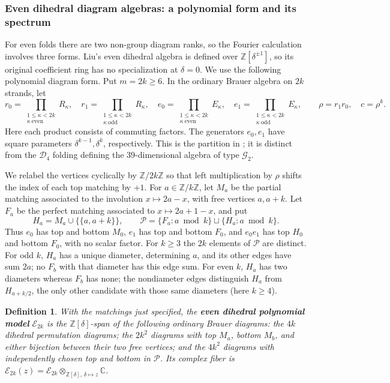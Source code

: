 \documentclass[11pt,a4paper]{amsart}
\theoremstyle{uprightdefinition}
\newtheorem{definition}[theorem]{Definition}
\theoremstyle{remark}\newtheorem{remark}[theorem]{Remark}
\begin{document}
\subsubsection*{Even dihedral diagram algebras: a polynomial form and its spectrum}

For even folds there are two non-group diagram ranks, so the Fourier
calculation involves three forms.
Liu's even dihedral algebra \cite[Definition~1.1]{LiuI22014}
is defined over $\mathbb Z[\delta^{\pm1}]$,
so its original coefficient ring has no specialization at $\delta=0$.
We use the following polynomial diagram form. Put $m=2k\ge6$.
In the ordinary Brauer algebra on $2k$ strands, let
\[
 r_0=\prod_{\substack{1\le \kappa<2k\\\kappa\ \mathrm{even}}}R_{\kappa},
 \quad r_1=\prod_{\substack{1\le \kappa<2k\\\kappa\ \mathrm{odd}}}R_{\kappa},
 \quad e_0=\prod_{\substack{1\le \kappa<2k\\\kappa\ \mathrm{even}}}E_{\kappa},
 \quad e_1=\prod_{\substack{1\le \kappa<2k\\\kappa\ \mathrm{odd}}}E_{\kappa},
 \qquad \rho=r_1r_0,\quad c=\rho^k.
\]
Here each product consists of commuting factors.  The generators $e_0,e_1$
have square parameters $\delta^{k-1},\delta^k$, respectively.  This is
the partition in \cite[Theorem~1.6]{LiuI22014}; it is distinct
from the $\mathscr{D}_4$ folding defining the $39$-dimensional algebra of type $\mathscr{G}_2$.

We relabel the vertices cyclically by $\mathbb Z/2k\mathbb Z$ so that left
multiplication by $\rho$ shifts the index of each top matching by $+1$.  For
$a\in\mathbb Z/k\mathbb Z$, let $M_a$ be the partial matching associated
to the involution $x\mapsto2a-x$, with free vertices $a,a+k$.  Let $F_a$
be the perfect matching associated to $x\mapsto2a+1-x$, and put
\[
 H_a=M_a\cup\{\{a,a+k\}\},\qquad
 \mathcal P=\{F_a:a\bmod k\}\sqcup\{H_a:a\bmod k\}.
\]
Thus $e_0$ has top and bottom $M_0$, $e_1$ has top and bottom $F_0$,
and $e_0e_1$ has top $H_0$ and bottom $F_0$, with no scalar factor.
For $k\ge3$ the $2k$ elements of $\mathcal P$ are distinct.  For odd $k$,
$H_a$ has a unique diameter, determining $a$, and its other edges have
sum $2a$; no $F_b$ with that diameter has this edge sum.  For even $k$,
$H_a$ has two diameters whereas $F_b$ has none; the nondiameter edges
distinguish $H_a$ from $H_{a+k/2}$, the only other candidate with those
same diameters (here $k\ge4$).

\begin{definition}\label{def:even-dihedral}
With the matchings just specified, the \textbf{even dihedral polynomial model}
$\mathcal E_{2k}$ is the $\mathbb Z[\delta]$-span of the following
ordinary Brauer diagrams:
the $4k$ dihedral permutation diagrams;
the $2k^2$ diagrams with top $M_a$, bottom $M_b$, and either bijection
between their two free vertices; and
the $4k^2$ diagrams with independently chosen top and bottom in $\mathcal P$.
Its complex fiber is
$\mathcal E_{2k}(z)=\mathcal E_{2k}\otimes_{\mathbb Z[\delta],\,\delta\mapsto z}\mathbb C$.
\end{definition}
\end{document}
